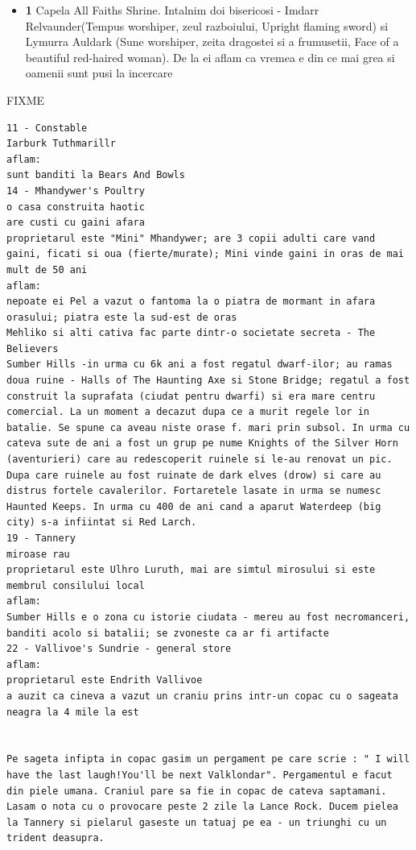 \documentclass[12pt,twoside]{book}
\begin{document}
\begin{itemize}
	\item \textbf{1} Capela All Faiths Shrine. Intalnim doi bisericosi - Imdarr Relvaunder(Tempus worshiper, zeul razboiului, Upright flaming sword) si  Lymurra Auldark (Sune worshiper, zeita dragostei si a frumusetii, Face of a beautiful red-haired woman). De la ei aflam ca vremea e din ce mai grea si oamenii sunt pusi la incercare
	
\end{itemize}

FIXME
\begin{verbatim}
11 - Constable
Iarburk Tuthmarillr
aflam:
sunt banditi la Bears And Bowls
14 - Mhandywer's Poultry
o casa construita haotic
are custi cu gaini afara
proprietarul este "Mini" Mhandywer; are 3 copii adulti care vand gaini, ficati si oua (fierte/murate); Mini vinde gaini in oras de mai mult de 50 ani
aflam:
nepoate ei Pel a vazut o fantoma la o piatra de mormant in afara orasului; piatra este la sud-est de oras
Mehliko si alti cativa fac parte dintr-o societate secreta - The Believers
Sumber Hills -in urma cu 6k ani a fost regatul dwarf-ilor; au ramas doua ruine - Halls of The Haunting Axe si Stone Bridge; regatul a fost construit la suprafata (ciudat pentru dwarfi) si era mare centru comercial. La un moment a decazut dupa ce a murit regele lor in batalie. Se spune ca aveau niste orase f. mari prin subsol. In urma cu cateva sute de ani a fost un grup pe nume Knights of the Silver Horn (aventurieri) care au redescoperit ruinele si le-au renovat un pic. Dupa care ruinele au fost ruinate de dark elves (drow) si care au distrus fortele cavalerilor. Fortaretele lasate in urma se numesc Haunted Keeps. In urma cu 400 de ani cand a aparut Waterdeep (big city) s-a infiintat si Red Larch.
19 - Tannery
miroase rau
proprietarul este Ulhro Luruth, mai are simtul mirosului si este membrul consilului local
aflam:
Sumber Hills e o zona cu istorie ciudata - mereu au fost necromanceri, banditi acolo si batalii; se zvoneste ca ar fi artifacte
22 - Vallivoe's Sundrie - general store
aflam:
proprietarul este Endrith Vallivoe
a auzit ca cineva a vazut un craniu prins intr-un copac cu o sageata neagra la 4 mile la est


Pe sageta infipta in copac gasim un pergament pe care scrie : " I will have the last laugh!You'll be next Valklondar". Pergamentul e facut din piele umana. Craniul pare sa fie in copac de cateva saptamani. Lasam o nota cu o provocare peste 2 zile la Lance Rock. Ducem pielea la Tannery si pielarul gaseste un tatuaj pe ea - un triunghi cu un trident deasupra.



\end{verbatim}
\end{document}
